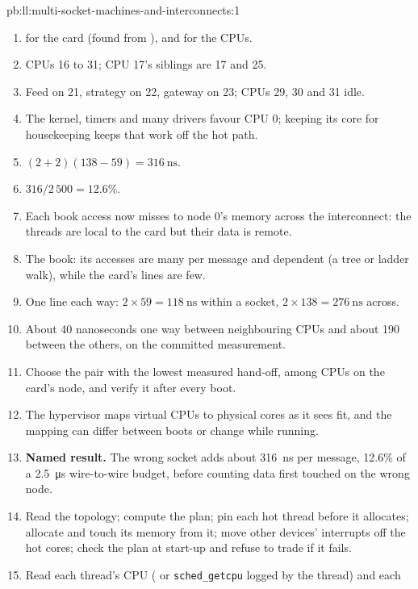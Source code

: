\begin{solution}{pb:ll:multi-socket-machines-and-interconnects:1}
\begin{enumerate}
\item {} for the card (found from
), and  for the CPUs.
\item CPUs 16 to 31; CPU 17's siblings are 17 and 25.
\item Feed on 21, strategy on 22, gateway on 23; CPUs 29, 30 and 31 idle.
\item The kernel, timers and many drivers favour CPU 0; keeping its core for housekeeping keeps that work off the hot
path.
\item $(2 + 2)(138 - 59) = \qty{316}{\nano\second}$.
\item $316/2\,500 = 12.6\%$.
\item Each book access now misses to node 0's memory across the interconnect: the threads are local to the card but their
data is remote.
\item The book: its accesses are many per message and dependent (a tree or ladder walk), while the card's lines are few.
\item One line each way: $2 \times 59 = \qty{118}{\nano\second}$ within a socket, $2 \times 138 = \qty{276}{\nano\second}$
across.
\item About 40 nanoseconds one way between neighbouring CPUs and about 190 between the others, on the committed
measurement.
\item Choose the pair with the lowest measured hand-off, among CPUs on the card's node, and verify it after every boot.
\item The hypervisor maps virtual CPUs to physical cores as it sees fit, and the mapping can differ between boots or change
while running.
\item \textbf{Named result.} The wrong socket adds about \qty{316}{\nano\second} per message, 12.6\% of a
\qty{2.5}{\micro\second} wire-to-wire budget, before counting data first touched on the wrong node.
\item Read the topology; compute the plan; pin each hot thread before it allocates; allocate and touch its memory from it;
move other devices' interrupts off the hot cores; check the plan at start-up and refuse to trade if it fails.
\item Read each thread's CPU ( or \texttt{sched\_getcpu} logged by the thread) and each

\end{enumerate}
\end{solution}
